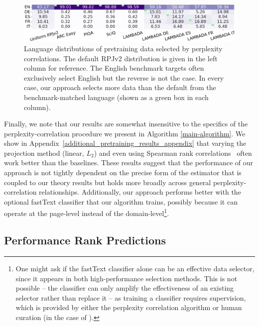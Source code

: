 \documentclass{article} %
\begin{document}
\begin{figure}[t]
\centering
\includegraphics[width=\linewidth]{images/token-dist-heatmap.png}

\caption{Language distributions of pretraining data selected by perplexity correlations. The default RPJv2 distribution is given in the left column for reference. The English benchmark targets often exclusively select English but the reverse is not the case. In every case, our approach selects more data than the default from the benchmark-matched language (shown as a green box in each column).}
\label{fig:weight_figure}
\end{figure}

Finally, we note that our results are somewhat insensitive to the specifics of the perplexity-correlation procedure we present in Algorithm \ref{main-algorithm}. We show in Appendix~\ref{additional_pretraining_results_appendix} that varying the projection method (linear, $L_2$) and even using Spearman rank correlations~\citep{spearmanr} often work better than the baselines. These results suggest that the performance of our approach is not tightly dependent on the precise form of the estimator that is coupled to our theory results but holds more broadly across general perplexity-correlation relationships. Additionally, our approach performs better with the optional fastText classifier that our algorithm trains, possibly because it can operate at the page-level instead of the domain-level\footnote{One might ask if the fastText classifier alone can be an effective data selector, since it appears in both high-performance selection methods. This is not possible -- the classifier can only amplify the effectiveness of an existing selector rather than replace it -- as training a classifier requires supervision, which is provided by either the perplexity correlation algorithm or human curation (in the case of \citet{datacomp}).}.

\subsection{Performance Rank Predictions}
\end{document}

